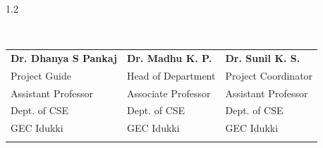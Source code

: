 \begin{spacing}{1.2}
\begin{center}
\quad\\[0.5cm]
\vspace{2 cm}
\begin{tabular}{p{5cm}p{5cm}p{5cm}}

\textbf{Dr. Dhanya S Pankaj} & \textbf{Dr. Madhu K. P.} & \textbf{Dr. Sunil K. S.} \\

Project Guide       & Head of Department      & Project Coordinator \\
Assistant Professor    & Associate Professor            & Assistant Professor \\
Dept. of CSE     & Dept. of CSE              & Dept. of CSE \\
GEC Idukki            &GEC Idukki                         &GEC Idukki \\
              &                         & \\

\end{tabular}
\end{center}
\end{spacing}
\vfill
